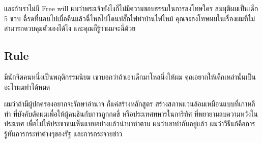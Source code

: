 และถ้าเราไม่มี Free will ผมว่าพระเจ้ายังไงก็ไม่มีความชอบธรรมในการลงโทษใคร
สมมุติผมเป็นเด็ก 5 ขวบ ฉี่รดที่นอนไปเมื่อคืนแล้วฉี่ไหลไปโดนปลั๊กไฟทำบ้านไฟไหม้
คุณจะลงโทษผมในเรื่องผมที่ไม่สามารถควบคุมตัวเองได้ไง
และคุณก็รู้ว่าผมจะฉี่ด้วย

\subsection{Rule}
มีนักจิตคนหนึ่งเป็นพฤติกรรมนิยม เขาบอกว่าถ้าเอาเด็กมาโหลนึ่งให้ผม คุณอยากให้เด็กเหล่านั้นเป็นอะไรผมทำได้หมด

ผมว่าถ้ามีผู้ปกครองอยากจะรักษาอำนาจ ก็แค่สร้างหลักสูตร สร้างสภาพแวนล้อมเหมือนแบบที่เกาหลีทำ
ที่บังคับตัดผมเพื่อให้ผู้คนชินกับการถูกกดขี่ หรือประเทศทหารในการิทัศ ที่พยายามลบความหวังในประเทศ
เพื่อไม่ให้ประชาชนเห็นแบบอย่างแล้วนำมาทำตาม ผมว่าเขาทำกันอยู่แล้ว ผมว่าวิธีแก้คือการรู้ทันการกระทำต่างๆของรัฐ
และการกระจายข่าว
